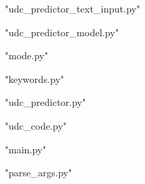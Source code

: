 \centerline{"udc\_predictor\_text\_input.py"}

\centerline{"udc\_predictor\_model.py"}

\centerline{"mode.py"}

\centerline{"keywords.py"}

\centerline{"udc\_predictor.py"}

\centerline{"udc\_code.py"}

\centerline{"main.py"}

\centerline{"parse\_args.py"}

